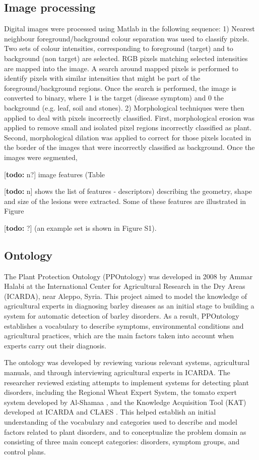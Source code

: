\documentclass{frontiersSCNS} %
\newcommand{\todo}[1]{
  \rule{0pt}{0pt}\marginpar{{\color{blue}\rule{1ex}{1ex}}}
  {[\textbf{\color{blue}todo:} #1]}}
\begin{document}
\subsection{Image processing}
Digital images were processed using Matlab \cite{MATLAB:2016} in the following sequence: 1) Nearest neighbour foreground/background colour separation was used to classify pixels. Two sets of colour intensities, corresponding to foreground (target) and to background (non target) are selected. RGB pixels matching selected intensities are mapped into the image. A search around mapped pixels is performed to identify pixels with similar intensities that might be part of the foreground/background regions. Once the search is performed, the image is converted to binary, where 1 is the target (disease symptom) and 0 the background (e.g. leaf, soil and stones). 2) Morphological techniques were then applied to deal with pixels incorrectly classified. First, morphological erosion was applied to remove small and isolated pixel regions incorrectly classified as plant. Second, morphological dilation was applied to correct for those pixels located in the border of the images that were incorrectly classified as background. Once the images were segmented, \todo{n?} image features (Table \todo{n} shows the list of features - descriptors) describing the geometry, shape and size of the lesions were extracted. Some of these features are illustrated in Figure \todo{?} (an example set is shown in Figure S1). 

\subsection{Ontology}
The Plant Protection Ontology (PPOntology) was developed in 2008 by Ammar Halabi at the International Center for Agricultural Research in the Dry Areas (ICARDA), near Aleppo, Syria. This project aimed to model the knowledge of agricultural experts in diagnosing barley diseases as an initial stage to building a system for automatic detection of barley disorders. As a result, PPOntology establishes a vocabulary to describe symptoms, environmental conditions and agricultural practices, which are the main factors taken into account when experts carry out their diagnosis.

The ontology was developed by reviewing various relevant systems, agricultural manuals, and through interviewing agricultural experts in ICARDA. The researcher reviewed existing attempts to implement systems for detecting plant disorders, including the Regional Wheat Expert System, the tomato expert system developed by Al-Shamaa \cite{}, and the Knowledge Acquisition Tool (KAT) \cite{boose1990knowledge} developed at ICARDA and
CLAES \cite{el2002expert}. This helped establish an initial understanding of the vocabulary and categories used to describe and model factors related to plant disorders, and to conceptualize the problem domain as consisting of three main concept categories: disorders, symptom groups, and control plans.
\end{document}
